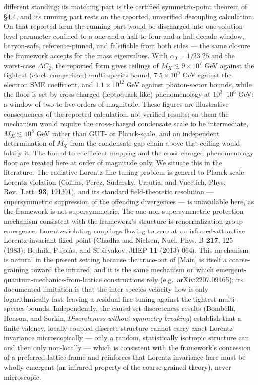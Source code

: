 \documentclass[
]{article}
\begin{document}
different standing: its matching part is the certified symmetric-point
theorem of §4.4, and its running part rests on the reported, unverified
decoupling calculation. On that reported form the running part would be
discharged into one solution-level parameter confined to a
one-and-a-half-to-four-and-a-half-decade window, baryon-safe,
reference-pinned, and falsifiable from both sides --- the same closure
the framework accepts for the mass eigenvalues. With
\(\alpha_0 = 1/23.25\) and the worst-case \(\Delta C_2\), the reported
form gives ceilings of \(M_X \lesssim 9\times10^{7}\) GeV against the
tightest (clock-comparison) multi-species bound, \(7.5\times10^{9}\) GeV
against the electron SME coefficient, and \(1.1\times10^{12}\) GeV
against photon-sector bounds, while the floor is set by cross-charged
(leptoquark-like) phenomenology at \(10^{3}\)--\(10^{6}\) GeV: a window
of two to five orders of magnitude. These figures are illustrative
consequences of the reported calculation, not verified results; on them
the mechanism would require the cross-charged condensate scale to be
intermediate, \(M_X \lesssim 10^{8}\) GeV rather than GUT- or
Planck-scale, and an independent determination of \(M_X\) from the
condensate-gap chain above that ceiling would falsify it. The
bound-to-coefficient mapping and the cross-charged phenomenology floor
are treated here at order of magnitude only. We situate this in the
literature. The radiative Lorentz-fine-tuning problem is general to
Planck-scale Lorentz violation (Collins, Perez, Sudarsky, Urrutia, and
Vucetich, Phys. Rev.~Lett. \textbf{93}, 191301), and its standard
field-theoretic resolution --- supersymmetric suppression of the
offending divergences --- is unavailable here, as the framework is not
supersymmetric. The one non-supersymmetric protection mechanism
consistent with the framework's structure is renormalization-group
emergence: Lorentz-violating couplings flowing to zero at an
infrared-attractive Lorentz-invariant fixed point (Chadha and Nielsen,
Nucl. Phys. B \textbf{217}, 125 (1983); Bednik, Pujolàs, and Sibiryakov,
JHEP \textbf{11} (2013) 064). This mechanism is natural in the present
setting because the trace-out of {[}Main{]} is itself a coarse-graining
toward the infrared, and it is the same mechanism on which
emergent-quantum-mechanics-from-lattice constructions rely
(e.g.~arXiv:2207.09465); its documented limitation is that the
inter-species velocity flow is only logarithmically fast, leaving a
residual fine-tuning against the tightest multi-species bounds.
Independently, the causal-set discreteness results (Bombelli, Henson,
and Sorkin, \emph{Discreteness without symmetry breaking}) establish
that a finite-valency, locally-coupled discrete structure cannot carry
exact Lorentz invariance microscopically --- only a random,
statistically isotropic structure can, and then only non-locally ---
which is consistent with the framework's concession of a preferred
lattice frame and reinforces that Lorentz invariance here must be wholly
emergent (an infrared property of the coarse-grained theory), never
microscopic.
\end{document}
